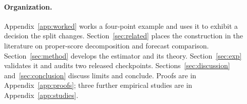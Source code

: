 \paragraph{Organization.}
Appendix~\ref{app:worked} works a four-point example and uses it to
exhibit a decision the split changes. Section~\ref{sec:related} places the
construction in the literature on proper-score decomposition and forecast comparison.
Section~\ref{sec:method} develops the estimator and its theory.
Section~\ref{sec:exp} validates it and audits two released checkpoints.
Sections~\ref{sec:discussion} and~\ref{sec:conclusion} discuss limits and conclude.
Proofs are in Appendix~\ref{app:proofs}; three further empirical
studies are in Appendix~\ref{app:studies}.
